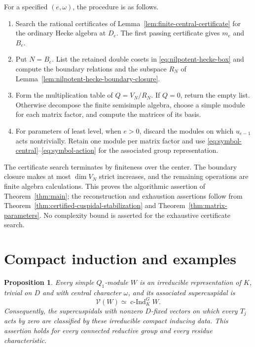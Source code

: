 \documentclass[10pt,letterpaper]{amsart}
\numberwithin{equation}{section}
\newtheorem{proposition}[theorem]{Proposition}
\theoremstyle{remark}
\begin{document}
For a specified $(e,\omega)$, the procedure is as follows.
\begin{enumerate}
\item Search the rational certificates of
Lemma~\ref{lem:finite-central-certificate} for the ordinary Hecke algebra
at $D_e$. The first passing certificate gives $m_e$ and $B_e$.
\item Put $N=B_e$. List the retained double cosets in
\eqref{eq:nilpotent-hecke-box} and compute the boundary relations and the
subspace $R_N$ of Lemma~\ref{lem:nilpotent-hecke-boundary-closure}.
\item Form the multiplication table of $Q=V_N/R_N$. If $Q=0$, return the
empty list. Otherwise decompose the finite semisimple algebra, choose a
simple module for each matrix factor, and compute the matrices of its basis.
\item For parameters of least level, when $e>0$, discard the modules on
which $u_{e-1}$ acts nontrivially. Retain one module per matrix factor and use
\eqref{eq:symbol-central}--\eqref{eq:symbol-action} for the associated group
representation.
\end{enumerate}
The certificate search terminates by finiteness over the center. The
boundary closure makes at most $\dim V_N$ strict increases, and the
remaining operations are finite algebra calculations. This proves the
algorithmic assertion of Theorem~\ref{thm:main}; the reconstruction and
exhaustion assertions follow from
Theorem~\ref{thm:certified-cuspidal-stabilization} and
Theorem~\ref{thm:matrix-parameters}. No complexity bound is asserted for
the exhaustive certificate search.

\section{Compact induction and examples}
\label{sec:exponent-one}

\begin{proposition}\label{prop:nilpotent-hecke-exponent-one}
Every simple $Q_1$-module $W$ is an irreducible representation of $K$,
trivial on $D$ and with central character $\omega$, and its associated
supercuspidal is
\[
 \mathcal V(W)\simeq\operatorname{c-Ind}_K^G W.
\]
Consequently, the supercuspidals with nonzero $D$-fixed vectors on which
every $T_j$ acts by zero are classified by these irreducible compact
inducing data. This assertion holds for every connected reductive group
and every residue characteristic.
\end{proposition}
\end{document}
